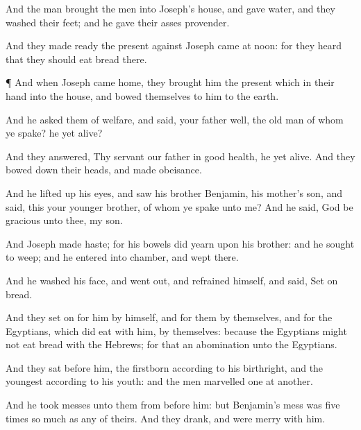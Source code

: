 {And the
man
brought the
men into
Joseph’s
house, and
gave
{}
water, and they
washed their
feet; and he
gave their
asses
provender.

And they made
ready the
present
against
Joseph
came at
noon: for they
heard that they should
eat
bread there.


\par }{\PP {}¶ And when
Joseph
came
home, they
brought him the
present which
{} in their
hand into the
house, and
bowed themselves to him to the
earth.

And he
asked them of
{}
welfare, and
said,
{} your
father
well, the old
man of whom ye
spake?
{} he yet
alive?

And they
answered, Thy
servant our
father
{} in good
health, he
{} yet
alive. And they bowed down their
heads, and made
obeisance.

And he lifted
up his
eyes, and
saw his
brother
Benjamin, his
mother’s
son, and
said,
{} this your
younger
brother, of whom ye
spake unto me? And he
said,
God be
gracious unto thee, my
son.

And
Joseph made
haste; for his
bowels did
yearn upon his
brother: and he
sought
{} to
weep; and he
entered into
{}
chamber, and
wept there.

And he
washed his
face, and went
out, and
refrained himself, and
said, Set
on
bread.

And they set
on for him by himself, and for them by themselves, and for the
Egyptians, which did
eat with him, by themselves: because the
Egyptians
might not
eat
bread with the
Hebrews; for that
{} an
abomination unto the
Egyptians.

And they
sat before
him, the
firstborn according to his
birthright, and the
youngest according to his
youth: and the
men
marvelled
one at
another.

And he
took
{}
messes unto them from before
him: but
Benjamin’s
mess was
five
times so much
as any of theirs. And they
drank, and were
merry with him.




\par }
